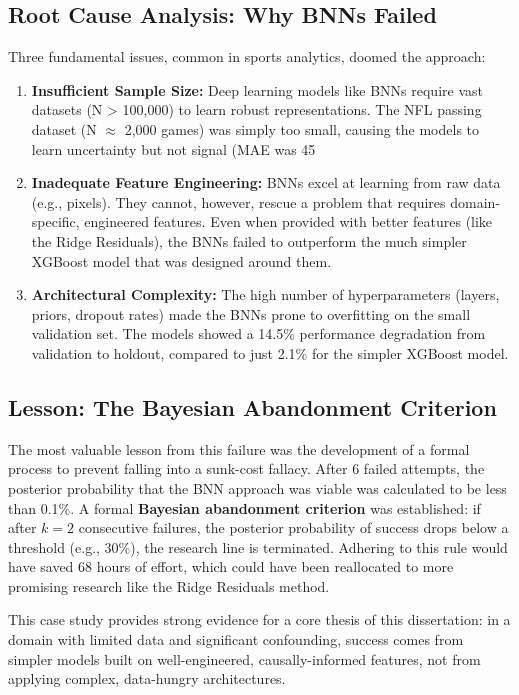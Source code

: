 \subsection{Root Cause Analysis: Why BNNs Failed}

Three fundamental issues, common in sports analytics, doomed the approach:
\begin{enumerate}
    \item \textbf{Insufficient Sample Size:} Deep learning models like BNNs require vast datasets (N > 100,000) to learn robust representations. The NFL passing dataset (N $\approx$ 2,000 games) was simply too small, causing the models to learn uncertainty but not signal (MAE was 45%
    \item \textbf{Inadequate Feature Engineering:} BNNs excel at learning from raw data (e.g., pixels). They cannot, however, rescue a problem that requires domain-specific, engineered features. Even when provided with better features (like the Ridge Residuals), the BNNs failed to outperform the much simpler XGBoost model that was designed around them.
    \item \textbf{Architectural Complexity:} The high number of hyperparameters (layers, priors, dropout rates) made the BNNs prone to overfitting on the small validation set. The models showed a 14.5\% performance degradation from validation to holdout, compared to just 2.1\% for the simpler XGBoost model.
\end{enumerate}

\subsection{Lesson: The Bayesian Abandonment Criterion}

The most valuable lesson from this failure was the development of a formal process to prevent falling into a sunk-cost fallacy. After 6 failed attempts, the posterior probability that the BNN approach was viable was calculated to be less than 0.1\%. A formal \textbf{Bayesian abandonment criterion} was established: if after $k=2$ consecutive failures, the posterior probability of success drops below a threshold (e.g., 30\%), the research line is terminated. Adhering to this rule would have saved 68 hours of effort, which could have been reallocated to more promising research like the Ridge Residuals method.

This case study provides strong evidence for a core thesis of this dissertation: in a domain with limited data and significant confounding, success comes from simpler models built on well-engineered, causally-informed features, not from applying complex, data-hungry architectures.

